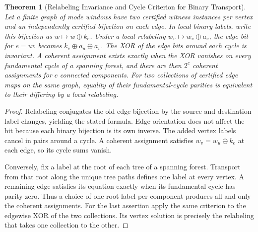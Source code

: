 \documentclass[11pt,a4paper]{article}
\newtheorem{theorem}{Theorem}[section]
\theoremstyle{definition}
\begin{document}
\begin{theorem}[Relabeling Invariance and Cycle Criterion for Binary Transport]\label{thm:bridge-binary-transport-gauge}
Let a finite graph of mode windows have two certified witness instances per vertex and an independently certified bijection on each edge. In local binary labels, write this bijection as $w\mapsto w\oplus k_e$. Under a local relabeling $w_v\mapsto w_v\oplus a_v$, the edge bit for $e=uv$ becomes $k_e\oplus a_u\oplus a_v$. The XOR of the edge bits around each cycle is invariant. A coherent assignment exists exactly when the XOR vanishes on every fundamental cycle of a spanning forest, and there are then $2^c$ coherent assignments for $c$ connected components. For two collections of certified edge maps on the same graph, equality of their fundamental-cycle parities is equivalent to their differing by a local relabeling.
\end{theorem}
\begin{proof}
Relabeling conjugates the old edge bijection by the source and destination label changes, yielding the stated formula. Edge orientation does not affect the bit because each binary bijection is its own inverse. The added vertex labels cancel in pairs around a cycle. A coherent assignment satisfies $w_v=w_u\oplus k_e$ at each edge, so its cycle sums vanish.

Conversely, fix a label at the root of each tree of a spanning forest. Transport from that root along the unique tree paths defines one label at every vertex. A remaining edge satisfies its equation exactly when its fundamental cycle has parity zero. Thus a choice of one root label per component produces all and only the coherent assignments. For the last assertion apply the same criterion to the edgewise XOR of the two collections. Its vertex solution is precisely the relabeling that takes one collection to the other.
\end{proof}
\end{document}
